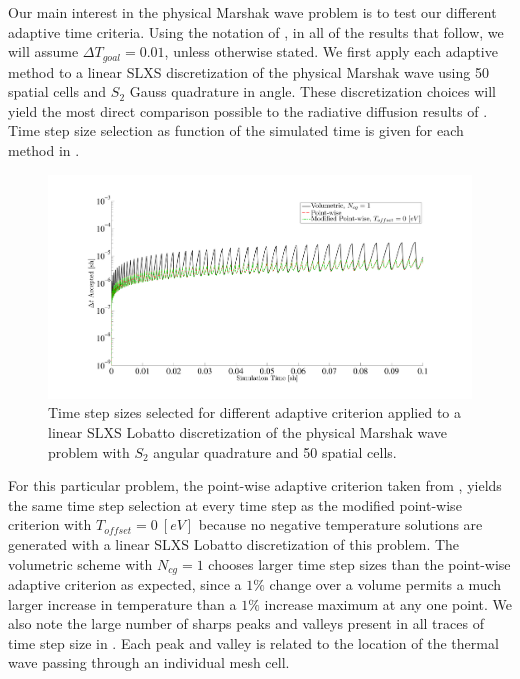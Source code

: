 Our main interest in the physical Marshak wave problem is to test our different adaptive time criteria.  
Using the notation of , in all of the results that follow, we will assume $\Delta T_{goal} = 0.01$, unless otherwise stated.
We first apply  each adaptive method to a linear SLXS discretization of the physical Marshak wave using 50 spatial cells and $S_2$ Gauss quadrature in angle.
These discretization choices will yield the most direct comparison possible to the radiative diffusion results of \cite{time_adaptive_diffusion}.
Time step size selection as function of the simulated time is given for each method in .
\begin{figure}[!htp]
\centering
\includegraphics[width=16cm,trim=1.5in  0.4in 0.5in 0.75in,clip=true]{chapter6_grey_radtran/Dissertation_Data/S2_P1_vs_time.pdf}
\caption{Time step sizes selected for different adaptive criterion applied to a linear SLXS Lobatto discretization of the physical Marshak wave problem with $S_2$ angular quadrature and 50 spatial cells.}
\label{fig:linear_time_steps}
\end{figure}
For this particular problem, the point-wise adaptive criterion taken from \cite{time_adaptive_diffusion}, yields the same time step selection at every time step as the modified point-wise criterion with $T_{offset}=0~[eV]$ because no negative temperature solutions are generated with a linear SLXS Lobatto discretization of this problem.
The volumetric scheme with $N_{cg}=1$ chooses larger time step sizes than the point-wise adaptive criterion as expected, since a $1\%$ change over a volume permits a much larger increase in temperature than a $1\%$ increase maximum at any one point.
We also note the large number of sharps peaks and valleys present in all traces of time step size in .  
Each peak and valley is related to the location of the thermal wave passing through an individual mesh cell.
